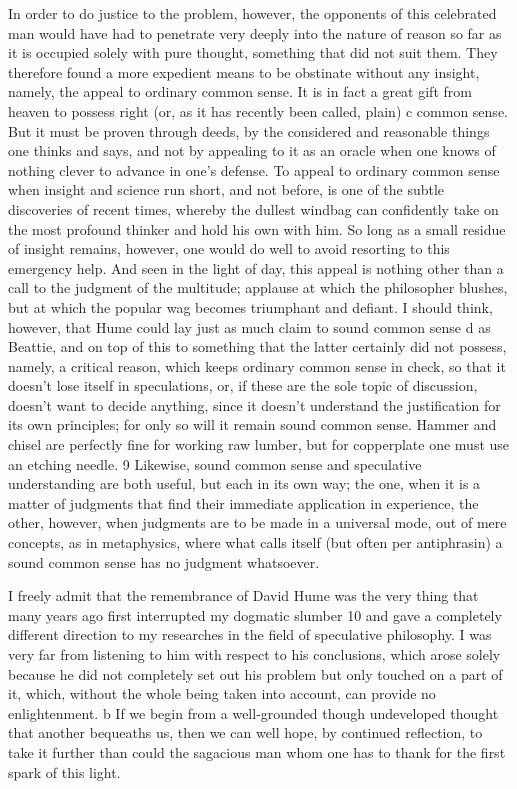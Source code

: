 In order to do justice to the problem, however, the opponents of this
celebrated man would have had to penetrate very deeply into the nature
of reason so far as it is occupied solely with pure thought, something
that did not suit them. They therefore found a more expedient means to
be obstinate without any insight, namely, the appeal to ordinary common
sense. It is in fact a great gift from heaven to possess right (or, as it
has recently been called, plain) c common sense. But it must be proven
through deeds, by the considered and reasonable things one thinks and
says, and not by appealing to it as an oracle when one knows of nothing
clever to advance in one’s defense. To appeal to ordinary common sense
when insight and science run short, and not before, is one of the subtle
discoveries of recent times, whereby the dullest windbag can conﬁdently
take on the most profound thinker and hold his own with him. So long
as a small residue of insight remains, however, one would do well to
avoid resorting to this emergency help. And seen in the light of day,
this appeal is nothing other than a call to the judgment of the multitude;
applause at which the philosopher blushes, but at which the popular wag
becomes triumphant and deﬁant. I should think, however, that Hume
could lay just as much claim to sound common sense d as Beattie, and on
top of this to something that the latter certainly did not possess, namely,
a critical reason, which keeps ordinary common sense in check, so that
it doesn’t lose itself in speculations, or, if these are the sole topic of
discussion, doesn’t want to decide anything, since it doesn’t understand
the justiﬁcation for its own principles; for only so will it remain sound
common sense. Hammer and chisel are perfectly ﬁne for working raw
lumber, but for copperplate one must use an etching needle. 9 Likewise,
sound common sense and speculative understanding are both useful,
but each in its own way; the one, when it is a matter of judgments that
ﬁnd their immediate application in experience, the other, however, when
judgments are to be made in a universal mode, out of mere concepts, as
in metaphysics, where what calls itself (but often per antiphrasin) a sound
common sense has no judgment whatsoever.

I freely admit that the remembrance of David Hume was the very
thing that many years ago ﬁrst interrupted my dogmatic slumber 10 and
gave a completely different direction to my researches in the ﬁeld of
speculative philosophy. I was very far from listening to him with respect
to his conclusions, which arose solely because he did not completely set
out his problem but only touched on a part of it, which, without the
whole being taken into account, can provide no enlightenment. b If we
begin from a well-grounded though undeveloped thought that another
bequeaths us, then we can well hope, by continued reﬂection, to take it
further than could the sagacious man whom one has to thank for the ﬁrst
spark of this light.

